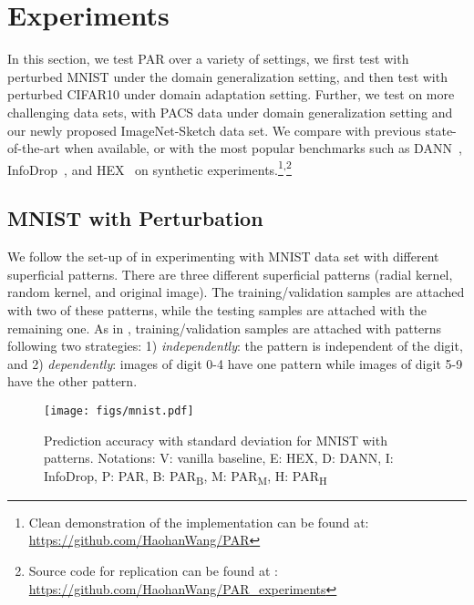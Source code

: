 \documentclass{article}
\begin{document}
\section{Experiments}
\label{sec:exp}
In this section, we test PAR over a variety of settings, we first test with perturbed MNIST under the domain generalization setting, and then test with perturbed CIFAR10 under domain adaptation setting. 
Further, we test on more challenging data sets, with PACS data under domain generalization setting and our newly proposed ImageNet-Sketch data set. 
We compare with previous state-of-the-art when available, or with the most popular benchmarks such as DANN~\citep{ganin2016domain}, InfoDrop~\citep{achille2018information}, and HEX~\citep{wang2018learning} on synthetic experiments.\footnote{Clean demonstration of the implementation can be found at: \href{https://github.com/HaohanWang/PAR}{https://github.com/HaohanWang/PAR}}\textsuperscript{,}\footnote{Source code for replication can be found at : \href{https://github.com/HaohanWang/PAR_experiments}{https://github.com/HaohanWang/PAR\_experiments}}

\subsection{MNIST with Perturbation}
We follow the set-up of 
\citet{wang2018learning} 
in experimenting with MNIST data set 
with different superficial patterns.
There are three 
different 
superficial patterns 
(radial kernel, random kernel, and original image). 
The training/validation samples 
are attached with two of these patterns, 
while the testing samples are attached with the remaining one. 
As in \citet{wang2018learning}, training/validation samples 
are attached with patterns following two strategies: 
1) \textit{independently}: the pattern is independent of the digit,
and 2) \textit{dependently}:
images of digit 0-4 have one pattern 
while images of digit 5-9 have the other pattern. 

\begin{figure}
    \centering
    \texttt{[image: figs/mnist.pdf]}
    \caption{Prediction accuracy with standard deviation for MNIST with patterns. Notations: V: vanilla baseline, E: HEX, D: DANN, I: InfoDrop, P: PAR, B: PAR\textsubscript{B}, M: PAR\textsubscript{M}, H: PAR\textsubscript{H}}
    \label{fig:mnist}
\end{figure}
\end{document}

